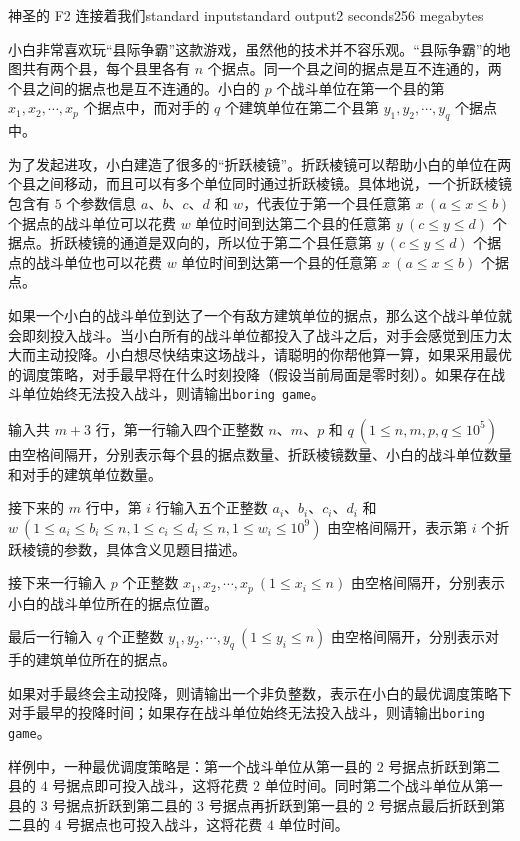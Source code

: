 \begin{problem}{神圣的 F2 连接着我们}{standard input}{standard output}{2 seconds}{256 megabytes}

    小白非常喜欢玩“县际争霸”这款游戏，虽然他的技术并不容乐观。“县际争霸”的地图共有两个县，每个县里各有 $n$ 个据点。同一个县之间的据点是互不连通的，两个县之间的据点也是互不连通的。小白的 $p$ 个战斗单位在第一个县的第 $x_1,x_2,\cdots,x_p$ 个据点中，而对手的 $q$ 个建筑单位在第二个县第 $y_1,y_2,\cdots,y_q$ 个据点中。

    为了发起进攻，小白建造了很多的“折跃棱镜”。折跃棱镜可以帮助小白的单位在两个县之间移动，而且可以有多个单位同时通过折跃棱镜。具体地说，一个折跃棱镜包含有 $5$ 个参数信息 $a$、$b$、$c$、$d$ 和 $w$，代表位于第一个县任意第 $x\ (a\le x\le b)$ 个据点的战斗单位可以花费 $w$ 单位时间到达第二个县的任意第 $y\ (c\le y\le d)$ 个据点。折跃棱镜的通道是双向的，所以位于第二个县任意第 $y\ (c\le y\le d)$ 个据点的战斗单位也可以花费 $w$ 单位时间到达第一个县的任意第 $x\ (a\le x\le b)$ 个据点。

    如果一个小白的战斗单位到达了一个有敌方建筑单位的据点，那么这个战斗单位就会即刻投入战斗。当小白所有的战斗单位都投入了战斗之后，对手会感觉到压力太大而主动投降。小白想尽快结束这场战斗，请聪明的你帮他算一算，如果采用最优的调度策略，对手最早将在什么时刻投降（假设当前局面是零时刻）。如果存在战斗单位始终无法投入战斗，则请输出\texttt{boring game}。

    \InputFile
    
    输入共 $m+3$ 行，第一行输入四个正整数 $n$、$m$、$p$ 和 $q\ (1\le n,m,p,q\le 10^5)$ 由空格间隔开，分别表示每个县的据点数量、折跃棱镜数量、小白的战斗单位数量和对手的建筑单位数量。

    接下来的 $m$ 行中，第 $i$ 行输入五个正整数 $a_i$、$b_i$、$c_i$、$d_i$ 和 $w\ (1\le a_i\le b_i\le n,1\le c_i\le d_i\le n,1\le w_i\le 10^9)$ 由空格间隔开，表示第 $i$ 个折跃棱镜的参数，具体含义见题目描述。

    接下来一行输入 $p$ 个正整数 $x_1,x_2,\cdots,x_p\ (1\le x_i\le n)$ 由空格间隔开，分别表示小白的战斗单位所在的据点位置。

    最后一行输入 $q$ 个正整数 $y_1,y_2,\cdots,y_q\ (1\le y_i\le n)$ 由空格间隔开，分别表示对手的建筑单位所在的据点。
    
    \OutputFile
    
    如果对手最终会主动投降，则请输出一个非负整数，表示在小白的最优调度策略下对手最早的投降时间；如果存在战斗单位始终无法投入战斗，则请输出\texttt{boring game}。
    
    \Example
    
    \begin{example}
    \end{example}

    \Note
    
    样例中，一种最优调度策略是：第一个战斗单位从第一县的 $2$ 号据点折跃到第二县的 $4$ 号据点即可投入战斗，这将花费 $2$ 单位时间。同时第二个战斗单位从第一县的 $3$ 号据点折跃到第二县的 $3$ 号据点再折跃到第一县的 $2$ 号据点最后折跃到第二县的 $4$ 号据点也可投入战斗，这将花费 $4$ 单位时间。

\end{problem}